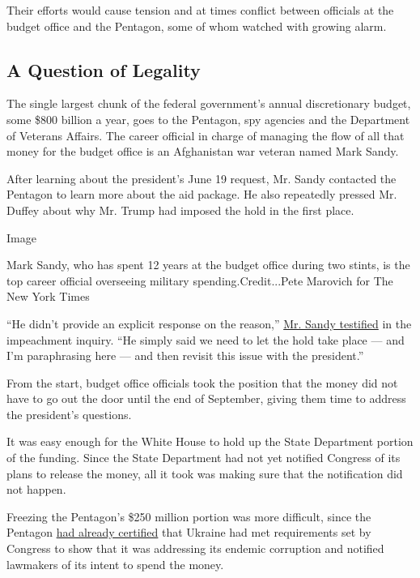 Their efforts would cause tension and at times conflict between
officials at the budget office and the Pentagon, some of whom watched
with growing alarm.

\hypertarget{a-question-of-legality}{%
\subsection{A Question of Legality}\label{a-question-of-legality}}

The single largest chunk of the federal government's annual
discretionary budget, some \$800 billion a year, goes to the Pentagon,
spy agencies and the Department of Veterans Affairs. The career official
in charge of managing the flow of all that money for the budget office
is an Afghanistan war veteran named Mark Sandy.

After learning about the president's June 19 request, Mr. Sandy
contacted the Pentagon to learn more about the aid package. He also
repeatedly pressed Mr. Duffey about why Mr. Trump had imposed the hold
in the first place.

Image

Mark Sandy, who has spent 12 years at the budget office during two
stints, is the top career official overseeing military
spending.Credit...Pete Marovich for The New York Times

``He didn't provide an explicit response on the reason,''
\href{https://www.documentcloud.org/documents/6592845-2019-11-Mark-Sandy-Final-Redacted.html\#document/p142/a541445}{Mr.
Sandy testified} in the impeachment inquiry. ``He simply said we need to
let the hold take place --- and I'm paraphrasing here --- and then
revisit this issue with the president.''

From the start, budget office officials took the position that the money
did not have to go out the door until the end of September, giving them
time to address the president's questions.

It was easy enough for the White House to hold up the State Department
portion of the funding. Since the State Department had not yet notified
Congress of its plans to release the money, all it took was making sure
that the notification did not happen.

Freezing the Pentagon's \$250 million portion was more difficult, since
the Pentagon
\href{https://www.documentcloud.org/documents/6593035-2019-05-23-Rood-DoD-Notification-on-USAI.html}{had
already certified} that Ukraine had met requirements set by Congress to
show that it was addressing its endemic corruption and notified
lawmakers of its intent to spend the money.

